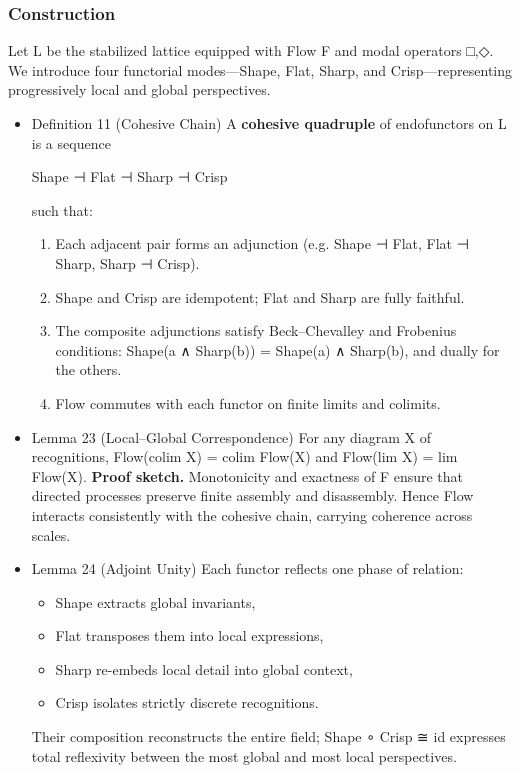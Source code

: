 \documentclass[11pt]{article}
\begin{document}
\subsubsection*{Construction}
\label{sec:org34ead65}
Let L be the stabilized lattice equipped with Flow F and modal operators □,◇.  
We introduce four functorial modes—Shape, Flat, Sharp, and Crisp—representing progressively local and global perspectives.
\begin{itemize}
\item Definition 11 (Cohesive Chain)
\label{sec:orgfddee7d}
A \textbf{cohesive quadruple} of endofunctors on L is a sequence

Shape ⊣ Flat ⊣ Sharp ⊣ Crisp

such that:
\begin{enumerate}
\item Each adjacent pair forms an adjunction (e.g. Shape ⊣ Flat, Flat ⊣ Sharp, Sharp ⊣ Crisp).
\item Shape and Crisp are idempotent; Flat and Sharp are fully faithful.
\item The composite adjunctions satisfy Beck–Chevalley and Frobenius conditions:  
Shape(a ∧ Sharp(b)) = Shape(a) ∧ Sharp(b), and dually for the others.
\item Flow commutes with each functor on finite limits and colimits.
\end{enumerate}
\item Lemma 23 (Local–Global Correspondence)
\label{sec:org538e86a}
For any diagram X of recognitions,  
Flow(colim X) = colim Flow(X) and Flow(lim X) = lim Flow(X).  
\textbf{Proof sketch.}  
Monotonicity and exactness of F ensure that directed processes preserve finite assembly and disassembly.  
Hence Flow interacts consistently with the cohesive chain, carrying coherence across scales.
\item Lemma 24 (Adjoint Unity)
\label{sec:orga01777e}
Each functor reflects one phase of relation:
\begin{itemize}
\item Shape extracts global invariants,
\item Flat transposes them into local expressions,
\item Sharp re-embeds local detail into global context,
\item Crisp isolates strictly discrete recognitions.
\end{itemize}
Their composition reconstructs the entire field;  
Shape ∘ Crisp ≅ id expresses total reflexivity between the most global and most local perspectives.
\end{itemize}
\end{document}

